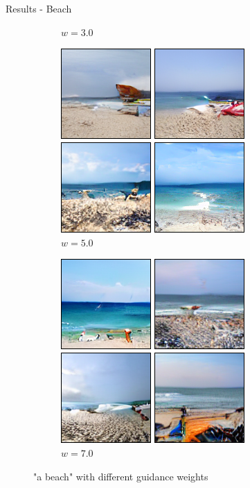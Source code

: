\documentclass[11pt]{beamer}
\begin{document}
\begin{frame}{Results - Beach}
\begin{figure}
\begin{subfigure}[b]{0.24\textwidth}
        \caption{$w=3.0$}
      \end{subfigure}
      \vspace{0.5em}
      \begin{subfigure}[b]{0.24\textwidth}
        \includegraphics[width=\linewidth]{figures/a_beach_5.png}
        \caption{$w=5.0$}
      \end{subfigure}
      \begin{subfigure}[b]{0.24\textwidth}
        \includegraphics[width=\linewidth]{figures/a_beach_7.png}
        \caption{$w=7.0$}
      \end{subfigure}
      \caption{"a beach" with different guidance weights}
    \end{figure}
  \end{frame}
\end{document}
